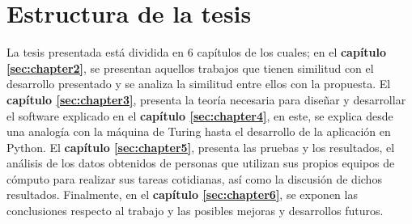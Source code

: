 \section{Estructura de la tesis}

La tesis presentada est\'a dividida en 6 cap\'itulos de los cuales; 
 en el \textbf{cap\'itulo \ref{sec:chapter2}}, se presentan aquellos 
 trabajos que tienen similitud con el desarrollo presentado y se analiza la 
 similitud entre ellos con la propuesta. El \textbf{cap\'itulo 
 \ref{sec:chapter3}}, presenta la teor\'ia necesaria para dise\~nar y 
 desarrollar el software explicado en el \textbf{cap\'itulo 
 \ref{sec:chapter4}}, en este, se explica desde una analog\'ia con la 
 m\'aquina de Turing hasta el desarrollo de la aplicaci\'on en Python. El 
 \textbf{cap\'itulo \ref{sec:chapter5}}, presenta las pruebas y los 
 resultados, el an\'alisis de los datos obtenidos de personas que utilizan 
 sus propios equipos de c\'omputo para realizar sus tareas cotidianas, as\'i 
 como la discusi\'on de dichos resultados. Finalmente, en el 
 \textbf{cap\'itulo \ref{sec:chapter6}}, se exponen las conclusiones 
 respecto al trabajo y las posibles mejoras y desarrollos futuros. 